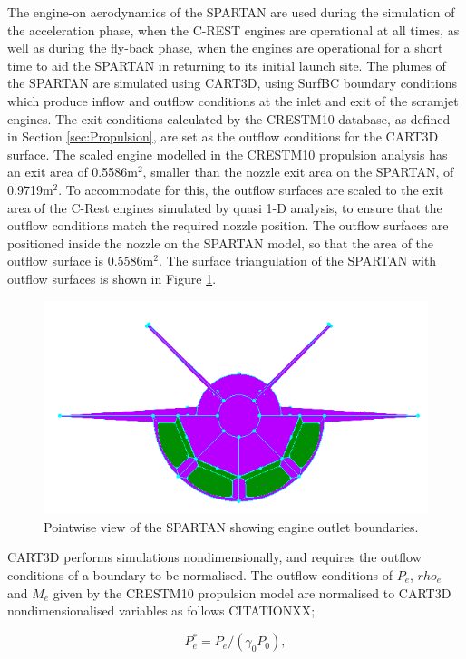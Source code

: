 		The engine-on aerodynamics of the SPARTAN are used during the simulation of the acceleration phase, when the C-REST engines are operational at all times, as well as during the fly-back phase, when the engines are operational for a short time to aid the SPARTAN in returning to its initial launch site. 		
		The plumes of the SPARTAN are simulated using CART3D, using SurfBC boundary conditions which produce inflow and outflow conditions at the inlet and exit of the scramjet engines\cite{Pandya2004}. The exit conditions calculated by the CRESTM10 database, as defined in Section \ref{sec:Propulsion}, are set as the outflow conditions for the CART3D surface. The scaled engine modelled in the CRESTM10 propulsion analysis has an exit area of 0.5586m$^2$, smaller than the nozzle exit area on the SPARTAN, of 0.9719m$^2$. 
		 To accommodate for this, the outflow surfaces are scaled to the exit area of the C-Rest engines simulated by quasi 1-D analysis, to ensure that the outflow conditions match the required nozzle position. The outflow surfaces are positioned inside the nozzle on the SPARTAN model, so that the area of the outflow surface is 0.5586m$^2$. The surface triangulation of the SPARTAN with outflow surfaces is shown in Figure \ref{fig:Pointwise-EngineBC}.
				\begin{figure}[ht]
					\centering
					\includegraphics[width=0.7\linewidth]{figures/3_vehicle_design/Pointwise-EngineBC}
					\caption{Pointwise view of the SPARTAN showing engine outlet boundaries.}
					\label{fig:Pointwise-EngineBC}
				\end{figure}
		 CART3D performs simulations nondimensionally, and requires the outflow conditions of a boundary to be normalised. The outflow conditions of $P_e$, $rho_e$ and $M_e$ given by the CRESTM10 propulsion model are normalised to CART3D nondimensionalised variables as follows CITATIONXX;
		
		\begin{equation}
		P_e^* = P_e/(\gamma_0 P_0),
		\end{equation}
		
